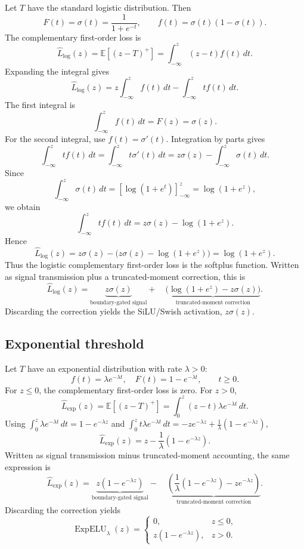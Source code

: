 \documentclass[11pt]{article}
\begin{document}
Let $ T $ have the standard logistic distribution. Then
$$
F(t)=\sigma(t)=\frac{1}{1+e^{-t}},
\qquad
f(t)=\sigma(t)(1-\sigma(t)).
$$
The complementary first-order loss is
$$
\widehat{L}_{\log}(z)
=
\mathbb{E}[(z-T)^+]
=
\int_{-\infty}^{z}(z-t)f(t)\,dt.
$$
Expanding the integral gives
$$
\widehat{L}_{\log}(z)
=
z\int_{-\infty}^{z}f(t)\,dt
-
\int_{-\infty}^{z}t f(t)\,dt.
$$
The first integral is
$$
\int_{-\infty}^{z}f(t)\,dt
=
F(z)
=
\sigma(z).
$$
For the second integral, use $f(t)=\sigma'(t)$. Integration by parts gives
$$
\int_{-\infty}^{z}t f(t)\,dt
=
\int_{-\infty}^{z}t\sigma'(t)\,dt
=
z\sigma(z)-\int_{-\infty}^{z}\sigma(t)\,dt.
$$
Since
$$
\int_{-\infty}^{z}\sigma(t)\,dt
=
\left[\log(1+e^t)\right]_{-\infty}^{z}
=
\log(1+e^z),
$$ 
we obtain
$$
\int_{-\infty}^{z}t f(t)\,dt
=
z\sigma(z)-\log(1+e^z).
$$
Hence
$$
\widehat{L}_{\log}(z)
=
z\sigma(z)
-
\bigl(z\sigma(z)-\log(1+e^z)\bigr)
=
\log(1+e^z).
$$
Thus the logistic complementary first-order loss is the softplus function. Written as signal transmission plus a truncated-moment correction, this is
$$\widehat{L}_{\log}(z)=\underbrace{z\sigma(z)}_{\text{boundary-gated signal}}+\quad\underbrace{\bigl(\log(1+e^z)-z\sigma(z)\bigr)}_{\text{truncated-moment correction}}.$$
Discarding the correction yields the SiLU/Swish activation, $z\sigma(z)$.

\subsection{Exponential threshold}

Let $T$ have an exponential distribution with rate $\lambda>0$:
$$
f(t)=\lambda e^{-\lambda t},\quad
F(t)=1-e^{-\lambda t},\qquad t\ge 0.
$$
For $ z\le 0 $, the complementary first-order loss is zero. For $ z>0 $,
$$
\widehat{L}_{\exp}(z)
=
\mathbb{E}[(z-T)^+]
=
\int_0^z (z-t)\lambda e^{-\lambda t}\,dt.
$$
Using $\int_0^z \lambda e^{-\lambda t}\,dt=1-e^{-\lambda z}$ and $\int_0^z t\lambda e^{-\lambda t}\,dt=-ze^{-\lambda z}+\tfrac{1}{\lambda}(1-e^{-\lambda z})$,
$$
\widehat{L}_{\exp}(z)
=
z-\frac{1}{\lambda}(1-e^{-\lambda z}).
$$Written as signal transmission minus truncated-moment accounting, the same expression is
$$
\widehat{L}_{\exp}(z)
=
\underbrace{z(1-e^{-\lambda z})}_{\text{boundary-gated signal}}
-\quad
\underbrace{\left(\frac{1}{\lambda}(1-e^{-\lambda z})-ze^{-\lambda z}\right)}_{\text{truncated-moment correction}}.
$$
Discarding the correction yields
$$
\operatorname{ExpELU}_{\lambda}(z)
=
\begin{cases}
0, & z\le 0,\\
z(1-e^{-\lambda z}), & z>0.
\end{cases}
$$
\end{document}

